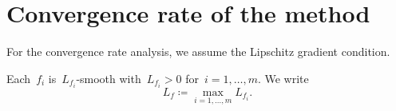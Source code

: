 \documentclass[../../main]{subfiles}
\begin{document}
\section{Convergence rate of the method} 
For the convergence rate analysis, we assume the Lipschitz gradient condition.
\begin{assumption} 
    Each~$f_i$ is~$L_{f_i}$-smooth with~$L_{f_i} > 0$ for~$i = 1, \dots, m$.
    We write
    \begin{equation} \label{eq:pgm_Lipschitz_constant}
        L_f \coloneqq \max_{i = 1, \dots, m} L_{f_i}
    .\end{equation} 
\end{assumption}
\end{document}
